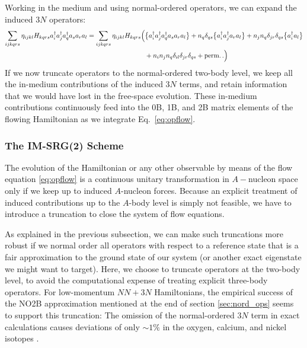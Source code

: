 Working in the medium and using normal-ordered operators, we can expand the 
induced $3N$ operators:
\begin{align}\label{eq:induced_3N_no}
  \sum_{ijkqrs}\eta_{ijkl}H_{kqrs} \aaO_{i}\aaO_{j}\aaO_{q}\aO_{s}\aO_{r}\aO_{l}
  =\sum_{ijkqrs}\eta_{ijkl}H_{kqrs} 
    \Big(&
      \nord{\aaO_{i}\aaO_{j}\aaO_{q}\aO_{s}\aO_{r}\aO_{l}} 
       + n_q\delta_{qs}\nord{\aaO_{i}\aaO_{j}\aO_{r}\aO_{l}} 
       + n_j n_q\delta_{jr}\delta_{qs}\nord{\aaO_{i}\aO_{l}} \notag\\
  &
       + n_in_j n_q\delta_{il}\delta_{jr}\delta_{qs}+ \text{perm.}\,.
    \Big)
\end{align}
If we now truncate operators to the normal-ordered two-body level, we keep
all the in-medium contributions of the induced $3N$ terms, and retain 
information that we would have lost in the free-space evolution. These
in-medium contributions continuously feed into the 0B, 1B, and 2B matrix 
elements of the flowing Hamiltonian as we integrate Eq.~\eqref{eq:opflow}.

%
%
\subsubsection{The IM-SRG(2) Scheme}
The evolution of the Hamiltonian or any other observable by means of
the flow equation \eqref{eq:opflow} is a continuous unitary transformation
in $A-$nucleon space only if we keep up to induced $A$-nucleon 
forces. Because an explicit treatment of induced contributions up to the 
$A$-body level is simply not feasible, we have to introduce a truncation 
to close the system of flow equations.

As explained in the previous subsection, we can make such truncations 
more robust if we normal order all operators with respect to a reference
state that is a fair approximation to the ground state of our system
(or another exact eigenstate we might want to target). Here, we choose
to truncate operators at the two-body level, to avoid the computational
expense of treating explicit three-body operators. For low-momentum $NN+3N$
Hamiltonians, the empirical success of the NO2B approximation mentioned 
at the end of section \ref{sec:nord_ops} seems to support this truncation: 
The omission of the normal-ordered $3N$ term in exact calculations causes 
deviations of only $\sim1\%$ in the oxygen, calcium, and nickel isotopes
\cite{Roth:2012qf,Binder:2013fk,Binder:2014fk}.

